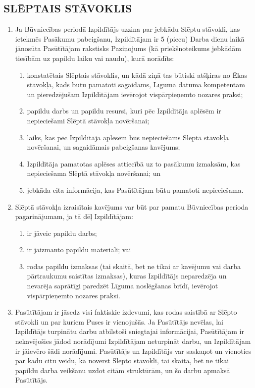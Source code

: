 \begin{multicols}{2}
\subsection{SLĒPTAIS STĀVOKLIS}
\begin{enumerate}
	\item Ja Būvniecības periodā Izpildītājs uzzina par jebkādu Slēptu stāvokli, kas ietekmēs Pasākumu pabeigšanu, Izpildītājam ir 5 (piecu) Darba dienu laikā jānosūta Pasūtītājam rakstisks Paziņojums (kā priekšnoteikums jebkādām tiesībām uz papildu laiku vai naudu), kurā norādīts:
	\begin{enumerate}
		\item konstatētais Slēptais stāvoklis, un kādā ziņā tas būtiski atšķiras no Ēkas stāvokļa, kāds būtu pamatoti sagaidāms, Līguma datumā kompetentam un pieredzējušam Izpildītājam ievērojot vispārpieņemto nozares praksi;
		\item papildu darbs un papildu resursi, kuri pēc Izpildītāja aplēsēm ir nepieciešami Slēptā stāvokļa novēršanai;
		\item laiks, kas pēc Izpildītāja aplēsēm būs nepieciešams Slēptā stāvokļa novēršanai, un sagaidāmais pabeigšanas kavējums;
		\item Izpildītāja pamatotas aplēses attiecībā uz to pasākumu izmaksām, kas nepieciešama Slēptā stāvokļa novēršanai; un
		\item jebkāda cita informācija, kas Pasūtītājam būtu pamatoti nepieciešama.
	\end{enumerate}
	\item Slēptā stāvokļa izraisītais kavējums var būt par pamatu Būvniecības perioda pagarinājumam, ja tā dēļ Izpildītājam:
	\begin{enumerate}
		\item ir jāveic papildu darbs;
		\item ir jāizmanto papildu materiāli; vai
		\item rodas papildu izmaksas (tai skaitā, bet ne tikai ar kavējumu vai darba pārtraukumu saistītas izmaksas), kuras Izpildītājs neparedzēja un nevarēja saprātīgi paredzēt Līguma noslēgšanas brīdī, ievērojot vispārpieņemto nozares praksi.
	\end{enumerate}
	\item Pasūtītājam ir jāsedz visi faktiskie izdevumi, kas rodas saistībā ar Slēpto stāvokli un par kuriem Puses ir vienojušās. Ja Pasūtītājs nevēlas, lai Izpildītājs turpinātu darbu atbilstoši sniegtajai informācijai, Pasūtītājam ir nekavējošies jādod norādījumi Izpildītājam neturpināt darbu, un Izpildītājam ir jāievēro šādi norādījumi. Pasūtītājs un Izpildītājs var saskaņot un vienoties par kādu citu veidu, kā novērst Slēpto stāvokli, tai skaitā, bet ne tikai papildu darba veikšanu uzdot citām struktūrām, un šo darbu apmaksā Pasūtītājs.

\end{enumerate}
\end{multicols}
